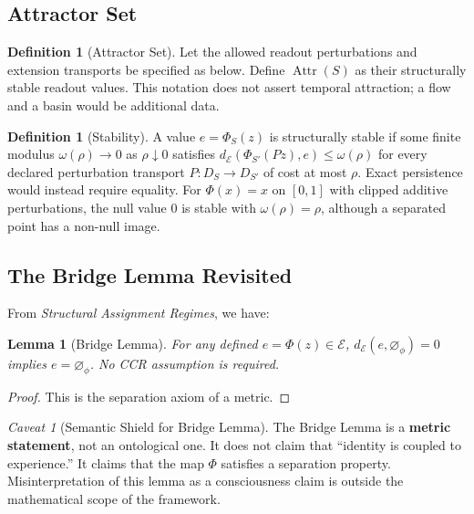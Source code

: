 \documentclass[11pt,a4paper]{article}
\theoremstyle{plain}
\newtheorem{lemma}[theorem]{Lemma}
\theoremstyle{definition}
\newtheorem{definition}[theorem]{Definition}
\theoremstyle{remark}
\newtheorem{caveat}[theorem]{Caveat}
\newcommand{\E}{\mathcal{E}}
\newcommand{\dE}{d_{\mathcal{E}}}
\newcommand{\nullphi}{\varnothing_\phi}
\newcommand{\Attr}{\operatorname{Attr}}
\begin{document}
\subsection{Attractor Set}

\begin{definition}[Attractor Set]
Let the allowed readout perturbations and extension transports be specified as below. Define $\Attr(S)$ as their structurally stable readout values. This notation does not assert temporal attraction; a flow and a basin would be additional data.
\end{definition}

\begin{definition}[Stability]
A value $e=\Phi_S(z)$ is structurally stable if some finite modulus $\omega(\rho)\to0$ as $\rho\downarrow0$ satisfies $\dE(\Phi_{S'}(Pz),e)\leq\omega(\rho)$ for every declared perturbation transport $P:D_S\to D_{S'}$ of cost at most $\rho$. Exact persistence would instead require equality. For $\Phi(x)=x$ on $[0,1]$ with clipped additive perturbations, the null value $0$ is stable with $\omega(\rho)=\rho$, although a separated point has a non-null image.
\end{definition}

\subsection{The Bridge Lemma Revisited}

From \textit{Structural Assignment Regimes}, we have:

\begin{lemma}[Bridge Lemma]\label{lem:bridge}
For any defined $e=\Phi(z)\in\E$, $\dE(e,\nullphi)=0$ implies $e=\nullphi$. No CCR assumption is required.
\end{lemma}

\begin{proof}
This is the separation axiom of a metric.
\end{proof}

\begin{caveat}[Semantic Shield for Bridge Lemma]
The Bridge Lemma is a \textbf{metric statement}, not an ontological one. It does not claim that ``identity is coupled to experience.'' It claims that the map $\Phi$ satisfies a separation property. Misinterpretation of this lemma as a consciousness claim is outside the mathematical scope of the framework.
\end{caveat}

\end{document}
